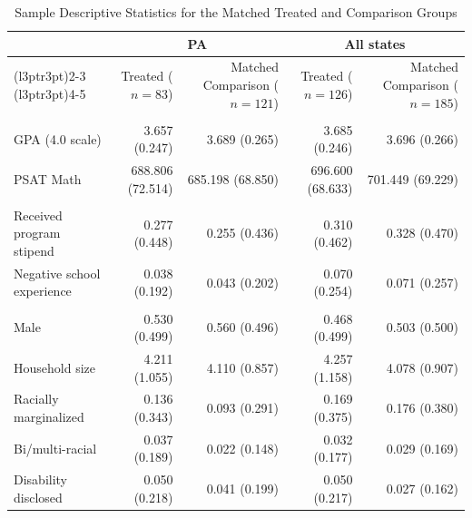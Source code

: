 \begin{table}[!h]
\centering
\caption{\label{tab:descriptives}Sample Descriptive Statistics for the Matched Treated and Comparison Groups}
\centering
\fontsize{10}{12}\selectfont
\begin{threeparttable}
\begin{tabular}[t]{lrrrr}
\toprule
\multicolumn{1}{c}{ } & \multicolumn{2}{c}{PA} & \multicolumn{2}{c}{All states} \\
\cmidrule(l{3pt}r{3pt}){2-3} \cmidrule(l{3pt}r{3pt}){4-5}
 & Treated ($n=83$) & Matched Comparison ($n=121$) & Treated ($n=126$) & Matched Comparison ($n=185$)\\
\midrule
\addlinespace[0.3em]
\multicolumn{5}{l}{Academic preparation}\\
\hspace{1em}GPA (4.0 scale) & 3.657 (0.247) & 3.689 (0.265) & 3.685 (0.246) & 3.696 (0.266)\\
\hspace{1em}PSAT Math & 688.806 (72.514) & 685.198 (68.850) & 696.600 (68.633) & 701.449 (69.229)\\
\addlinespace[3pt]
\addlinespace[0.3em]
\multicolumn{5}{l}{Program participation}\\
\hspace{1em}Received program stipend & 0.277 (0.448) & 0.255 (0.436) & 0.310 (0.462) & 0.328 (0.470)\\
\hspace{1em}Negative school experience & 0.038 (0.192) & 0.043 (0.202) & 0.070 (0.254) & 0.071 (0.257)\\
\addlinespace[3pt]
\addlinespace[0.3em]
\multicolumn{5}{l}{Demographics}\\
\hspace{1em}Male & 0.530 (0.499) & 0.560 (0.496) & 0.468 (0.499) & 0.503 (0.500)\\
\hspace{1em}Household size & 4.211 (1.055) & 4.110 (0.857) & 4.257 (1.158) & 4.078 (0.907)\\
\hspace{1em}Racially marginalized & 0.136 (0.343) & 0.093 (0.291) & 0.169 (0.375) & 0.176 (0.380)\\
\hspace{1em}Bi/multi-racial & 0.037 (0.189) & 0.022 (0.148) & 0.032 (0.177) & 0.029 (0.169)\\
\hspace{1em}Disability disclosed & 0.050 (0.218) & 0.041 (0.199) & 0.050 (0.217) & 0.027 (0.162)\\

\end{tabular}
\end{threeparttable}
\end{table}
